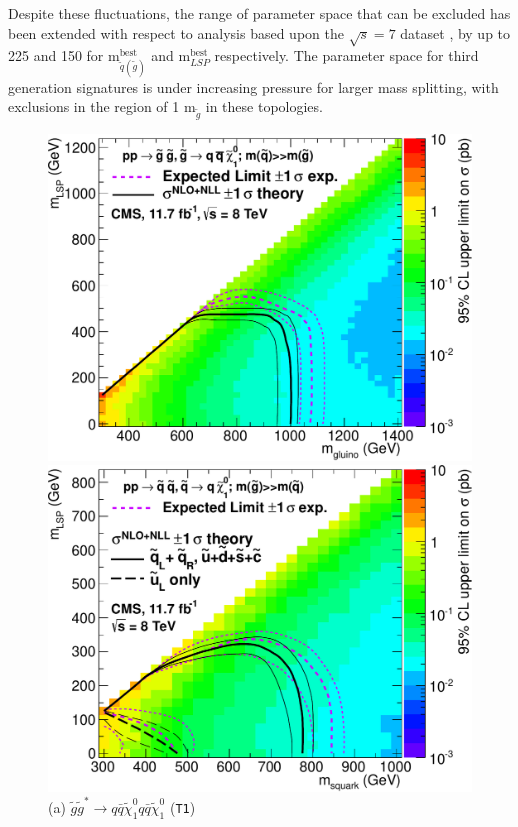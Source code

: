 Despite these fluctuations, the range of parameter space that can be excluded has been extended with respect to analysis based upon the $\sqrt{s} = 7$ \fb dataset \cite{Chatrchyan:2012wa}, by up to 225 and 150 \GeV for m$_{\tilde{q}(\tilde{g})}^{\text{best}}$ and m$_{LSP}^{\text{best}}$ respectively. The parameter space for third generation signatures is under increasing pressure for larger mass splitting, with exclusions in the region of 1 \TeV m$_{\tilde{g}}$ in these topologies. 

\begin{figure}[ht]
\footnotesize
\centering
\begin{minipage}[b]{0.48 \linewidth}
\includegraphics[width = 1.0\linewidth]{plots/t1.pdf}
\centering \caption*{(a) $\widetilde{g}\widetilde{g}^{*} \rightarrow q\bar{q}\widetilde{\chi}^{0}_{1}q\bar{q}\widetilde{\chi}^{0}_{1}$ (\texttt{T1})}\label{fig:t1}
\end{minipage}
\quad
\begin{minipage}[b]{0.48\linewidth}
\includegraphics[width = 1.0\linewidth]{plots/t2.pdf}

\end{minipage}
\end{figure}
